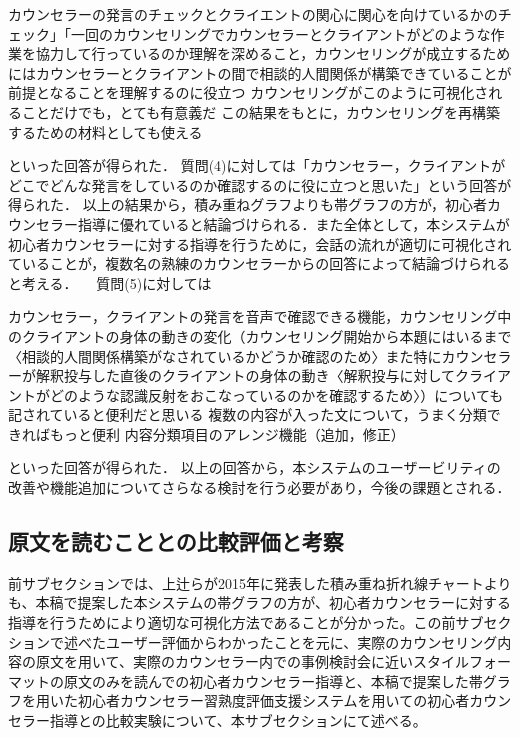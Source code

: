 \documentclass[shuuron]{kuee}
\begin{document}
  カウンセラーの発言のチェックとクライエントの関心に関心を向けているかのチェック」「一回のカウンセリングでカウンセラーとクライアントがどのような作業を協力して行っているのか理解を深めること，カウンセリングが成立するためにはカウンセラーとクライアントの間で相談的人間関係が構築できていることが前提となることを理解するのに役立つ
  カウンセリングがこのように可視化されることだけでも，とても有意義だ
  この結果をもとに，カウンセリングを再構築するための材料としても使える

といった回答が得られた．
質問(4)に対しては「カウンセラー，クライアントがどこでどんな発言をしているのか確認するのに役に立つと思いた」という回答が得られた．
以上の結果から，積み重ねグラフよりも帯グラフの方が，初心者カウンセラー指導に優れていると結論づけられる．また全体として，本システムが初心者カウンセラーに対する指導を行うために，会話の流れが適切に可視化されていることが，複数名の熟練のカウンセラーからの回答によって結論づけられると考える．
　質問(5)に対しては

  カウンセラー，クライアントの発言を音声で確認できる機能，カウンセリング中のクライアントの身体の動きの変化（カウンセリング開始から本題にはいるまで〈相談的人間関係構築がなされているかどうか確認のため〉また特にカウンセラーが解釈投与した直後のクライアントの身体の動き〈解釈投与に対してクライアントがどのような認識反射をおこなっているのかを確認するため〉）についても記されていると便利だと思いる
  複数の内容が入った文について，うまく分類できればもっと便利
  内容分類項目のアレンジ機能（追加，修正）



といった回答が得られた．
以上の回答から，本システムのユーザービリティの　改善や機能追加についてさらなる検討を行う必要があり，今後の課題とされる．

\subsection{原文を読むこととの比較評価と考察}




前サブセクションでは、上辻らが2015年に発表した積み重ね折れ線チャートよりも、本稿で提案した本システムの帯グラフの方が、初心者カウンセラーに対する指導を行うためにより適切な可視化方法であることが分かった。この前サブセクションで述べたユーザー評価からわかったことを元に、実際のカウンセリング内容の原文を用いて、実際のカウンセラー内での事例検討会に近いスタイルフォーマットの原文のみを読んでの初心者カウンセラー指導と、本稿で提案した帯グラフを用いた初心者カウンセラー習熟度評価支援システムを用いての初心者カウンセラー指導との比較実験について、本サブセクションにて述べる。
\end{document}
